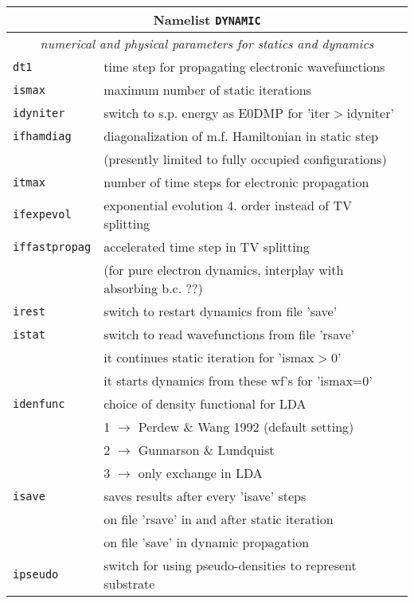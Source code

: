 \documentclass[12pt]{article}
\begin{document}
\begin{tabular}{ll}
\hline
\multicolumn{2}{c}{Namelist {\tt DYNAMIC}} in {\tt for005.<name>} \\
\hline
\multicolumn{2}{c}{\it numerical and physical parameters for statics and dynamics} \\
\hline
{\tt dt1              }& time step for propagating electronic wavefunctions\\
{\tt ismax            }& maximum number of static iterations \\
{\tt idyniter         }& switch to s.p. energy as E0DMP for 'iter$>$idyniter'\\
{\tt ifhamdiag} & diagonalization of m.f. Hamiltonian in static step\\
& (presently limited to fully occupied configurations)\\
{\tt itmax            }& number of time steps for electronic propagation\\
{\tt ifexpevol} & exponential evolution 4. order instead of TV splitting\\
{\tt iffastpropag} & accelerated time step in TV splitting\\
  & (for pure electron dynamics, interplay with absorbing b.c. ??)\\
{\tt irest            }& switch to restart dynamics from file 'save'\\
{\tt istat            }& switch to read wavefunctions from file 'rsave'\\
{\tt } &\hspace*{1em}it continues static iteration for 'ismax$>$0' \\
{\tt } &\hspace*{1em}it starts dynamics from these wf's for 'ismax=0' \\
{\tt idenfunc} & choice of density functional for LDA\\
               & 1 $\rightarrow$ Perdew \& Wang 1992 (default setting)\\
               & 2 $\rightarrow$ Gunnarson \& Lundquist\\
               & 3  $\rightarrow$ only exchange in  LDA \\
{\tt isave            }& saves results after every 'isave' steps \\
{\tt                  }& on file 'rsave' in and after static iteration\\
{\tt                  }& on file 'save' in dynamic propagation\\
{\tt ipseudo          }& switch for using pseudo-densities to represent substrate\\

\end{tabular}
\end{document}
